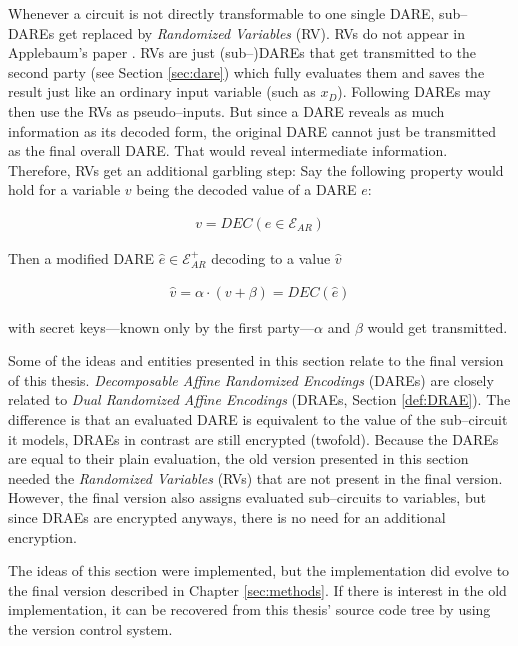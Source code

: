 \label{sec:rv}

Whenever a circuit is not directly transformable to one single DARE, sub--DAREs
get replaced by \emph{Randomized Variables} (RV). RVs do not appear in
Applebaum's paper \cite{gac2012}. RVs are just (sub--)DAREs that
get transmitted to the second party (see Section \ref{sec:dare}) which
fully evaluates them and saves the result just like an ordinary input variable
(such as $x_D$). Following DAREs may then use the RVs as pseudo--inputs. But
since a DARE reveals as much information as its decoded form, the original DARE
cannot just be transmitted as the final overall DARE. That would reveal
intermediate information. Therefore, RVs get an additional garbling step: Say
the following property would hold for a variable $v$ being the decoded value of
a DARE $e$:

\begin{align*}
  v = DEC(e \in \mathcal{E}_{AR})
\end{align*}

\noindent{}Then a modified DARE $\hat{e} \in \mathcal{E}_{AR}^+$ decoding to a
value $\hat{v}$

\begin{align*}
\hat{v} = \alpha \cdot (v + \beta) = DEC(\hat{e})
\end{align*}

\noindent{}with secret keys---known only by the first party---$\alpha$ and
$\beta$ would get transmitted.



Some of the ideas and entities presented in this section relate to the final
version of this thesis. \emph{Decomposable Affine Randomized Encodings} (DAREs)
are closely related to \emph{Dual Randomized Affine Encodings} (DRAEs, Section
\ref{def:DRAE}). The difference is that an evaluated DARE is equivalent to the
value of the sub--circuit it models, DRAEs in contrast are still
encrypted (twofold). Because the DAREs are equal to their plain evaluation,
the old version presented in this section needed the \emph{Randomized Variables}
(RVs) that are not present in the final version. However, the final version
also assigns evaluated sub--circuits to variables, but since DRAEs are encrypted
anyways, there is no need for an additional encryption.



The ideas of this section were implemented, but the implementation did
evolve to the final version described in Chapter \ref{sec:methods}. If
there is interest in the old implementation, it can be recovered from this
thesis' source code tree by using the \JWTgit{} version control system.

